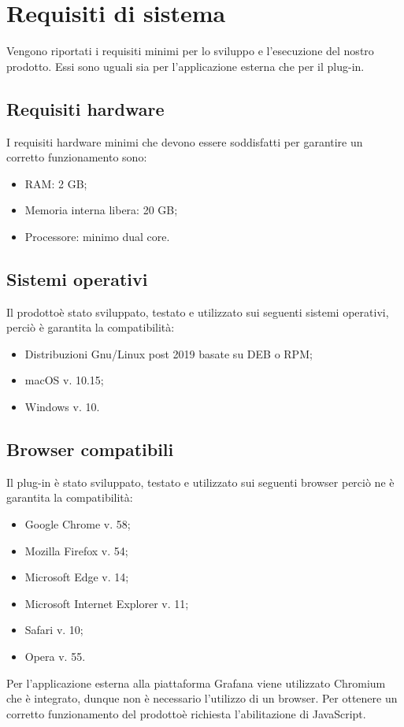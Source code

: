 \section{Requisiti di sistema}
Vengono riportati i requisiti minimi per lo sviluppo e l'esecuzione del nostro prodotto\glo. Essi sono uguali sia per l'applicazione esterna che per il plug-in.

\subsection{Requisiti hardware}
I requisiti hardware minimi che devono essere soddisfatti per garantire un corretto funzionamento sono:
\begin{itemize}
	\item RAM: 2 GB;
	\item Memoria interna libera: 20 GB;
	\item Processore: minimo dual core.
\end{itemize}

\subsection{Sistemi operativi}
Il prodotto\glosp è stato sviluppato, testato e utilizzato sui seguenti sistemi operativi, perciò è garantita la compatibilità:
\begin{itemize}
	\item Distribuzioni Gnu/Linux post 2019 basate su DEB o RPM;
	\item macOS v. 10.15;
	\item Windows v. 10.
\end{itemize}

\subsection{Browser compatibili}
Il plug-in è stato sviluppato, testato e utilizzato sui seguenti browser perciò ne è garantita la compatibilità:
\begin{itemize}
	\item Google Chrome v. 58;
	\item Mozilla Firefox v. 54;
	\item Microsoft Edge v. 14;
	\item Microsoft Internet Explorer v. 11;
	\item Safari v. 10;
	\item Opera v. 55.
\end{itemize}
Per l'applicazione esterna alla piattaforma Grafana viene utilizzato Chromium che è integrato, dunque non è necessario l'utilizzo di un browser.
Per ottenere un corretto funzionamento del prodotto\glosp è richiesta l'abilitazione di JavaScript.
